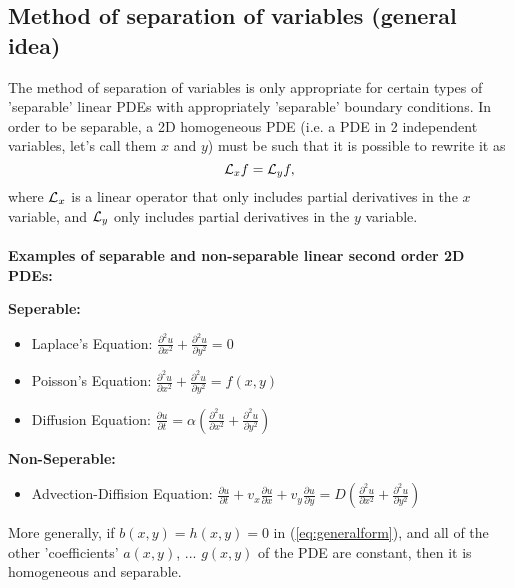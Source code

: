 \subsection{Method of separation of variables (general idea)}

The method of separation of variables is only appropriate for  certain types of 'separable' linear PDEs with appropriately 'separable' boundary conditions. 
In order to be separable, a 2D homogeneous PDE (i.e. a PDE in 2 independent variables, let's call them $x$ and $y$) must be such that it is possible to rewrite it as 
\begin{equation}
    {\cal L}_x f = {\cal L}_y f,
    \label{eq:separablecondition}
\end{equation}
where ${\cal L}_x$ is a linear operator that only includes partial derivatives in the $x$ variable, and ${\cal L}_y$ only includes partial derivatives in the $y$ variable. 
\\
\\
{\bf Examples of separable and non-separable linear second order 2D PDEs:}
\begin{itemize}
{\color{red} \item  {\bf Seperable:}
    \begin{itemize}
    \item Laplace's Equation: $ \frac{\partial^2 u}{\partial x^2} + \frac{\partial^2 u}{\partial y^2} = 0 $
    \item Poisson's Equation: $ \frac{\partial^2 u}{\partial x^2} + \frac{\partial^2 u}{\partial y^2} = f(x, y) $
    \item Diffusion Equation: $\frac{\partial u}{\partial t} = \alpha \left( \frac{\partial^2 u}{\partial x^2} + \frac{\partial^2 u}{\partial y^2} \right) $
    \end{itemize}
\item {\bf Non-Seperable:}   
    \begin{itemize}
    \item Advection-Diffision Equation: $ \frac{\partial u}{\partial t} + v_x \frac{\partial u}{\partial x} + v_y \frac{\partial u}{\partial y} = D \left( \frac{\partial^2 u}{\partial x^2} + \frac{\partial^2 u}{\partial y^2} \right) $ 

    \end{itemize}
}
\end{itemize}
More generally, if $b(x,y) = h(x,y) = 0$ in (\ref{eq:generalform}), and all of the other 'coefficients' $a(x,y)$, ... $g(x,y)$ of the PDE are constant, then it is homogeneous and separable. 
